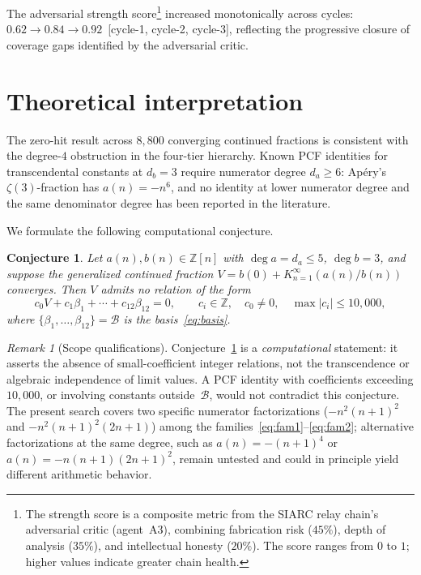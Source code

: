 \documentclass[11pt]{amsart}
\newcommand{\Z}{\mathbb{Z}}
\newcommand{\calB}{\mathcal{B}}
\theoremstyle{plain}
\newtheorem{conjecture}{Conjecture}
\theoremstyle{remark}
\newtheorem{remark}{Remark}
\begin{document}
The adversarial strength
score\footnote{The strength score is a composite metric from
the SIARC relay chain's adversarial critic (agent~A3),
combining fabrication risk ($45\%$),
depth of analysis ($35\%$), and intellectual honesty ($20\%$).
The score ranges from $0$ to $1$; higher values indicate
greater chain health.}
increased monotonically across cycles:
$0.62 \to 0.84 \to 0.92$~[cycle-1, cycle-2, cycle-3],
reflecting the progressive closure of coverage gaps
identified by the adversarial critic.

\section{Theoretical interpretation}\label{sec:theory}

The zero-hit result across $8{,}800$ converging continued
fractions is consistent with the degree-$4$ obstruction in the
four-tier hierarchy.
Known PCF identities for transcendental constants at $d_b = 3$
require numerator degree $d_a \geq 6$:
Ap\'ery's $\zeta(3)$-fraction has $a(n) = -n^6$,
and no identity at lower numerator degree and the same denominator
degree has been reported in the literature.

We formulate the following computational conjecture.

\begin{conjecture}\label{conj:desert}
Let $a(n), b(n) \in \Z[n]$ with $\deg a = d_a \leq 5$,
$\deg b = 3$, and suppose the generalized continued fraction
$V = b(0) + K_{n=1}^{\infty}(a(n)/b(n))$ converges.
Then $V$ admits no relation of the form
\[
  c_0 V + c_1 \beta_1 + \cdots + c_{12} \beta_{12} = 0,
  \qquad c_i \in \Z, \quad c_0 \neq 0,
  \quad \max|c_i| \leq 10{,}000,
\]
where $\{\beta_1, \ldots, \beta_{12}\} = \calB$
is the basis~\eqref{eq:basis}.
\end{conjecture}

\begin{remark}[Scope qualifications]
Conjecture~\ref{conj:desert} is a \emph{computational} statement:
it asserts the absence of small-coefficient integer relations,
not the transcendence or algebraic independence of limit values.
A PCF identity with coefficients exceeding $10{,}000$, or
involving constants outside~$\calB$, would not contradict
this conjecture.
The present search covers two specific numerator factorizations
($-n^2(n+1)^2$ and $-n^2(n+1)^2(2n+1)$) among the
families~\eqref{eq:fam1}--\eqref{eq:fam2};
alternative factorizations at the same degree, such as
$a(n) = -(n+1)^4$ or $a(n) = -n(n+1)(2n+1)^2$,
remain untested and could in principle yield different
arithmetic behavior.
\end{remark}
\end{document}
